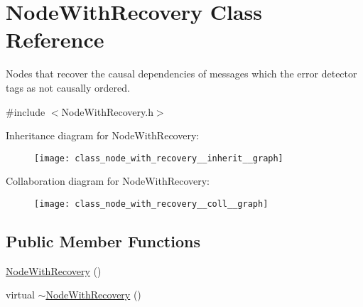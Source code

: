 \hypertarget{class_node_with_recovery}{}\section{Node\+With\+Recovery Class Reference}
\label{class_node_with_recovery}


Nodes that recover the causal dependencies of messages which the error detector tags as not causally ordered.  




{\ttfamily \#include $<$Node\+With\+Recovery.\+h$>$}



Inheritance diagram for Node\+With\+Recovery\+:\nopagebreak
\begin{figure}[H]
\begin{center}
\leavevmode
\texttt{[image: class\_node\_with\_recovery\_\_inherit\_\_graph]}
\end{center}
\end{figure}


Collaboration diagram for Node\+With\+Recovery\+:\nopagebreak
\begin{figure}[H]
\begin{center}
\leavevmode
\texttt{[image: class\_node\_with\_recovery\_\_coll\_\_graph]}
\end{center}
\end{figure}
\subsection*{Public Member Functions}
\begin{DoxyCompactItemize}
\item 
\hyperlink{class_node_with_recovery_aed1d9b2cfa7729902c90c103ab3075ff}{Node\+With\+Recovery} ()
\item 
virtual \hyperlink{class_node_with_recovery_a5cb1367a800cf960b96c9011ab94a616}{$\sim$\+Node\+With\+Recovery} ()
\end{DoxyCompactItemize}
